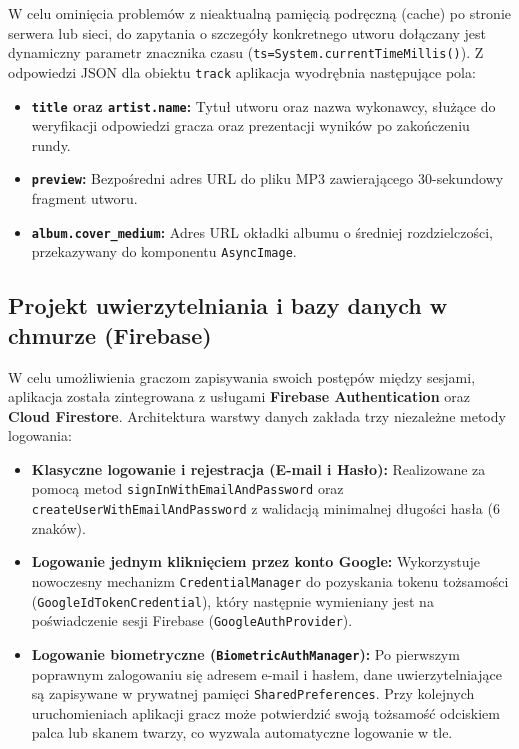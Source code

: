 \hspace{0.60cm}W celu ominięcia problemów z nieaktualną pamięcią podręczną (cache) po stronie serwera lub sieci, do zapytania o szczegóły konkretnego utworu dołączany jest dynamiczny parametr znacznika czasu (\texttt{ts=System.currentTimeMillis()}). Z odpowiedzi JSON dla obiektu \texttt{track} aplikacja wyodrębnia następujące pola:
\begin{itemize}
    \item \textbf{\texttt{title} oraz \texttt{artist.name}:} Tytuł utworu oraz nazwa wykonawcy, służące do weryfikacji odpowiedzi gracza oraz prezentacji wyników po zakończeniu rundy.
    \item \textbf{\texttt{preview}:} Bezpośredni adres URL do pliku MP3 zawierającego 30-sekundowy fragment utworu.
    \item \textbf{\texttt{album.cover\_medium}:} Adres URL okładki albumu o średniej rozdzielczości, przekazywany do komponentu \texttt{AsyncImage}.
\end{itemize}

\subsection{Projekt uwierzytelniania i bazy danych w chmurze (Firebase)}

\hspace{0.60cm}W celu umożliwienia graczom zapisywania swoich postępów między sesjami, aplikacja została zintegrowana z usługami \textbf{Firebase Authentication} oraz \textbf{Cloud Firestore}. Architektura warstwy danych zakłada trzy niezależne metody logowania:
\begin{itemize}
    \item \textbf{Klasyczne logowanie i rejestracja (E-mail i Hasło):} Realizowane za pomocą metod \texttt{signInWithEmailAndPassword} oraz \texttt{createUserWithEmailAndPassword} z walidacją minimalnej długości hasła ($6$ znaków).
    \item \textbf{Logowanie jednym kliknięciem przez konto Google:} Wykorzystuje nowoczesny mechanizm \texttt{CredentialManager} do pozyskania tokenu tożsamości (\texttt{GoogleIdTokenCredential}), który następnie wymieniany jest na poświadczenie sesji Firebase (\texttt{GoogleAuthProvider}).
    \item \textbf{Logowanie biometryczne (\texttt{BiometricAuthManager}):} Po pierwszym poprawnym zalogowaniu się adresem e-mail i hasłem, dane uwierzytelniające są zapisywane w prywatnej pamięci \texttt{SharedPreferences}. Przy kolejnych uruchomieniach aplikacji gracz może potwierdzić swoją tożsamość odciskiem palca lub skanem twarzy, co wyzwala automatyczne logowanie w tle.
\end{itemize}

